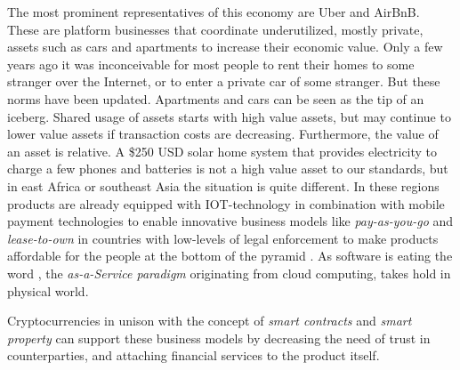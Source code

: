 The most prominent representatives of this economy are Uber and AirBnB. These are platform businesses that coordinate underutilized, mostly private, assets such as cars and apartments to increase their economic value. Only a few years ago it was inconceivable for most people to rent their homes to some stranger over the Internet, or to enter a private car of some stranger. But these norms have been updated. Apartments and cars can be seen as the tip of an iceberg. Shared usage of assets starts with high value assets, but may continue to lower value assets if transaction costs are decreasing. Furthermore, the value of an asset is relative. A \$250 USD solar home system that provides electricity to charge a few phones and batteries is not a high value asset to our standards, but in east Africa or southeast Asia the situation is quite different. In these regions products are already equipped with \ac{IOT}-technology in combination with mobile payment technologies to enable innovative business models like \emph{pay-as-you-go} and \emph{lease-to-own} in countries with low-levels of legal enforcement to make products affordable for the people at the bottom of the pyramid \parencite{ISI:000351842100012}. As software is eating the word \parencite{andreessen2011software}, the \emph{as-a-Service paradigm} originating from cloud computing, takes hold in physical world. 

Cryptocurrencies in unison with the concept of \emph{smart contracts} and \emph{smart property} \parencite{szabo1997idea,smartproperty2011} can support these business models by decreasing the need of trust in counterparties, and attaching financial services to the product itself.



